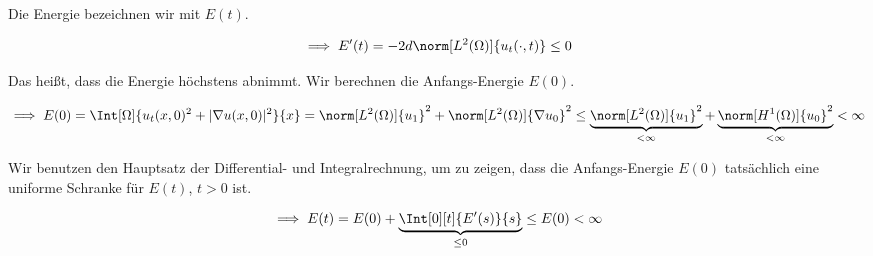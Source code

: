 \begin{solution}
\begin{enumerate}[label = (\roman*)]
    Die Energie bezeichnen wir mit $E(t)$.

    \begin{align*}
        \implies
        E^\prime(t)
        =
        -2 d \norm[L^2(\Omega)]{u_t(\cdot, t)}
        \leq
        0
    \end{align*}

    Das heißt, dass die Energie höchstens abnimmt.
    Wir berechnen die Anfangs-Energie $E(0)$.

    \begin{align*}
        \implies
        E(0)
        =
        \Int[\Omega]{u_t(x, 0)^2 + |\nabla u(x, 0)|^2}{x}
        =
        \norm[L^2(\Omega)]{u_1}^2 + \norm[L^2(\Omega)]{\nabla u_0}^2
        \leq
        \underbrace
        {
            \norm[L^2(\Omega)]{u_1}^2
        }_{
            < \infty
        }
        +
        \underbrace
        {
            \norm[H^1(\Omega)]{u_0}^2
        }_{
            < \infty
        }
        <
        \infty
    \end{align*}

    Wir benutzen den Hauptsatz der Differential- und Integralrechnung, um zu zeigen, dass die Anfangs-Energie $E(0)$ tatsächlich eine uniforme Schranke für $E(t)$, $t > 0$ ist.

    \begin{align*}
        \implies
        E(t)
        =
        E(0)
        +
        \underbrace
        {
            \Int[0][t]{E^\prime(s)}{s}
        }_{
            \leq 0
        }
        \leq
        E(0)
        <
        \infty
    \end{align*}

\end{enumerate}
    
\end{solution}

